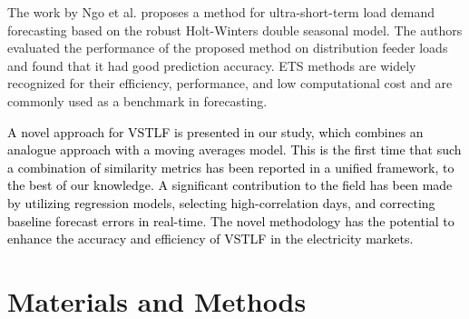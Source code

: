 \documentclass[journal, twoside]{IEEEtran}
\begin{document}
The work by Ngo et al. \cite{VietCuong2015} proposes a method for ultra-short-term load demand forecasting based on the robust Holt-Winters double seasonal model. The authors evaluated the performance of the proposed method on distribution feeder loads and found that it had good prediction accuracy. \ac{ETS} methods are widely recognized for their efficiency, performance, and low computational cost and are commonly used as a benchmark in forecasting.

\textcolor{black}{A novel approach for \ac{VSTLF} is presented in our study, which combines an analogue approach with a moving averages model. This is the first time that such a combination of similarity metrics has been reported in a unified framework, to the best of our knowledge. A significant contribution to the field has been made by utilizing regression models, selecting high-correlation days, and correcting baseline forecast errors in real-time. The novel methodology has the potential to enhance the accuracy and efficiency of \ac{VSTLF} in the electricity markets.}















\section{Materials and Methods}
\label{sec:MaterialsandMethods}

\end{document}
